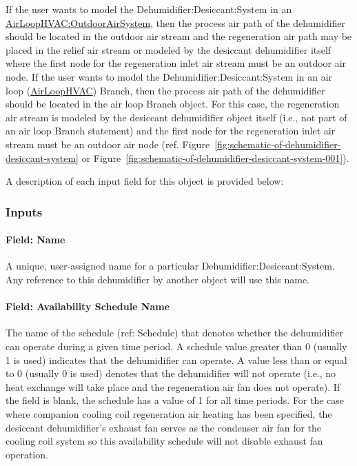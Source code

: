 If the user wants to model the Dehumidifier:Desiccant:System in an \hyperref[airloophvacoutdoorairsystem]{AirLoopHVAC:OutdoorAirSystem}, then the process air path of the dehumidifier should be located in the outdoor air stream and the regeneration air path may be placed in the relief air stream or modeled by the desiccant dehumidifier itself where the first node for the regeneration inlet air stream must be an outdoor air node. If the user wants to model the Dehumidifier:Desiccant:System in an air loop (\hyperref[airloophvac]{AirLoopHVAC}) Branch, then the process air path of the dehumidifier should be located in the air loop Branch object. For this case, the regeneration air stream is modeled by the desiccant dehumidifier object itself (i.e., not part of an air loop Branch statement) and the first node for the regeneration inlet air stream must be an outdoor air node (ref. Figure~\ref{fig:schematic-of-dehumidifier-desiccant-system} or Figure~\ref{fig:schematic-of-dehumidifier-desiccant-system-001}).

A description of each input field for this object is provided below:

\subsubsection{Inputs}\label{inputs-1-010}

\paragraph{Field: Name}\label{field-name-1-009}

A unique, user-assigned name for a particular Dehumidifier:Desiccant:System. Any reference to this dehumidifier by another object will use this name.

\paragraph{Field: Availability Schedule Name}\label{field-availability-schedule-name-1-002}

The name of the schedule (ref: Schedule) that denotes whether the dehumidifier can operate during a given time period. A schedule value greater than 0 (usually 1 is used) indicates that the dehumidifier can operate. A value less than or equal to 0 (usually 0 is used) denotes that the dehumidifier will not operate (i.e., no heat exchange will take place and the regeneration air fan does not operate). If the field is blank, the schedule has a value of 1 for all time periods. For the case where companion cooling coil regeneration air heating has been specified, the desiccant dehumidifier's exhaust fan serves as the condenser air fan for the cooling coil system so this availability schedule will not disable exhaust fan operation.

